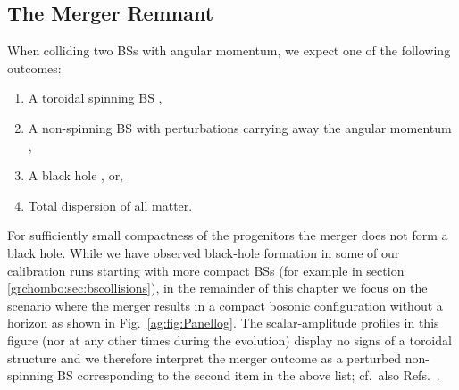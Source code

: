 \subsection{The Merger Remnant}\label{ag:sec:Remannt}



When colliding two BSs with angular momentum, we
expect one of the following outcomes:
\begin{enumerate}
    \item A toroidal spinning BS
        \cite{PhysRevD.90.024068,Yoshida:1997qf,1996rscc.conf..138S,Siemonsen:2020hcg},
    \item A non-spinning BS with perturbations carrying away the angular
        momentum
        \cite{Macedo:2013jja,Macedo:2016wgh,Yoshida:1994xi,Flores:2019iwp},
    \item A black hole \cite{Helfer:2018vtq,Palenzuela:2017kcg,Bezares:2018qwa}, or,
    \item Total dispersion of all matter.
\end{enumerate}
For sufficiently small compactness of the progenitors the merger does not form a
black hole. While we have observed black-hole
formation in some of our calibration runs starting with more compact
BSs (for example in section \ref{grchombo:sec:bscollisions}), in the remainder
of this chapter we focus on the scenario
where the merger results in a compact bosonic configuration
without a horizon as shown in Fig.~\ref{ag:fig:Panellog}.
The scalar-amplitude profiles in this figure (nor at any other
times during the evolution) display no signs
of a toroidal structure and we therefore interpret the merger
outcome as a perturbed non-spinning BS corresponding to the
second item in the above list; cf.~also
Refs.~\cite{Palenzuela:2017kcg,Bezares:2018qwa}.



